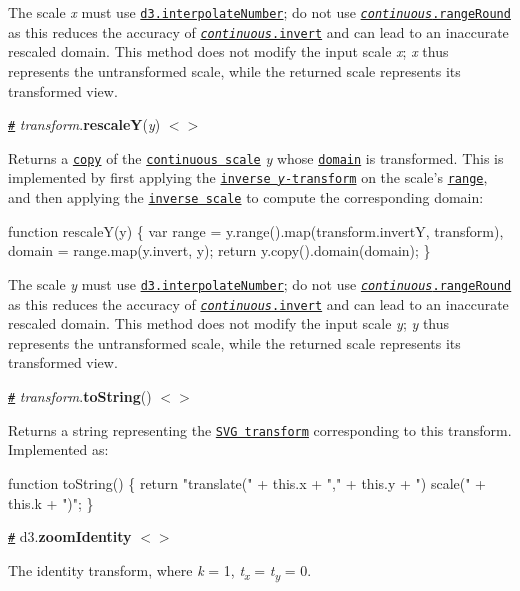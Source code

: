 The scale {\itshape x} must use \href{https://github.com/d3/d3-interpolate#interpolateNumber}{\tt d3.\+interpolate\+Number}; do not use \href{https://github.com/d3/d3-scale#continuous_rangeRound}{\tt {\itshape continuous}.range\+Round} as this reduces the accuracy of \href{https://github.com/d3/d3-scale#continuous_invert}{\tt {\itshape continuous}.invert} and can lead to an inaccurate rescaled domain. This method does not modify the input scale {\itshape x}; {\itshape x} thus represents the untransformed scale, while the returned scale represents its transformed view.

\href{#transform_rescaleY}{\tt \#} {\itshape transform}.{\bfseries rescaleY}({\itshape y}) \href{https://github.com/d3/d3-zoom/blob/master/src/transform.js#L36}{\tt $<$$>$}

Returns a \href{https://github.com/d3/d3-scale#continuous_copy}{\tt copy} of the \href{https://github.com/d3/d3-scale#continuous-scales}{\tt continuous scale} {\itshape y} whose \href{https://github.com/d3/d3-scale#continuous_domain}{\tt domain} is transformed. This is implemented by first applying the \href{#transform_invertY}{\tt inverse {\itshape y}-\/transform} on the scale’s \href{https://github.com/d3/d3-scale#continuous_range}{\tt range}, and then applying the \href{https://github.com/d3/d3-scale#continuous_invert}{\tt inverse scale} to compute the corresponding domain\+:


\begin{DoxyCode}
function rescaleY(y) \{
  var range = y.range().map(transform.invertY, transform),
      domain = range.map(y.invert, y);
  return y.copy().domain(domain);
\}
\end{DoxyCode}


The scale {\itshape y} must use \href{https://github.com/d3/d3-interpolate#interpolateNumber}{\tt d3.\+interpolate\+Number}; do not use \href{https://github.com/d3/d3-scale#continuous_rangeRound}{\tt {\itshape continuous}.range\+Round} as this reduces the accuracy of \href{https://github.com/d3/d3-scale#continuous_invert}{\tt {\itshape continuous}.invert} and can lead to an inaccurate rescaled domain. This method does not modify the input scale {\itshape y}; {\itshape y} thus represents the untransformed scale, while the returned scale represents its transformed view.

\href{#transform_toString}{\tt \#} {\itshape transform}.{\bfseries to\+String}() \href{https://github.com/d3/d3-zoom/blob/master/src/transform.js#L39}{\tt $<$$>$}

Returns a string representing the \href{https://www.w3.org/TR/SVG/coords.html#TransformAttribute}{\tt S\+VG transform} corresponding to this transform. Implemented as\+:


\begin{DoxyCode}
function toString() \{
  return "translate(" + this.x + "," + this.y + ") scale(" + this.k + ")";
\}
\end{DoxyCode}


\href{#zoomIdentity}{\tt \#} d3.{\bfseries zoom\+Identity} \href{https://github.com/d3/d3-zoom/blob/master/src/transform.js#L44}{\tt $<$$>$}

The identity transform, where {\itshape k} = 1, {\itshape t\textsubscript{x}} = {\itshape t\textsubscript{y}} = 0. 